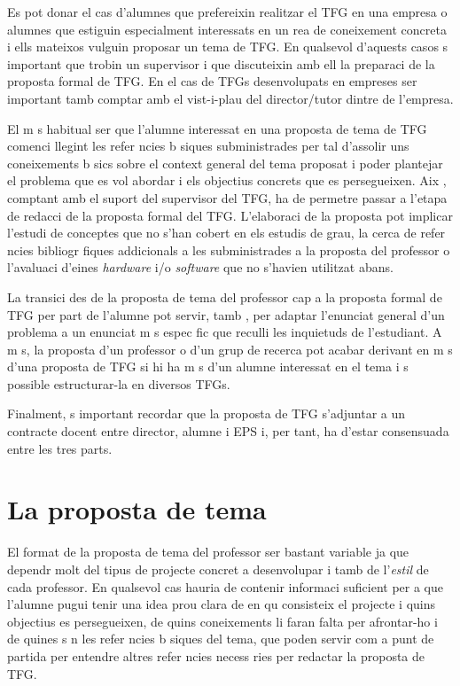 Es pot donar el cas d'alumnes que prefereixin realitzar el \ac{TFG} en una empresa o alumnes que estiguin especialment interessats en un  rea de coneixement concreta i ells mateixos vulguin proposar un tema de \ac{TFG}. En qualsevol d'aquests casos  s important que trobin un supervisor i que discuteixin amb ell la preparaci  de la proposta formal de \ac{TFG}. En el cas de \ac{TFG}s desenvolupats en empreses ser  important tamb  comptar amb el vist-i-plau del director/tutor dintre de l'empresa.

El m s habitual ser  que l'alumne interessat en una proposta de tema de \ac{TFG} comenci llegint les refer ncies b siques subministrades per tal d'assolir uns coneixements b sics sobre el context general del tema proposat i poder plantejar el problema que es vol abordar i els objectius concrets que es persegueixen. Aix , comptant amb el suport del supervisor del \ac{TFG}, ha de permetre passar a l'etapa de redacci  de la proposta formal del \ac{TFG}. L'elaboraci  de la proposta pot implicar l'estudi de conceptes que no s'han cobert en els estudis de grau, la cerca de refer ncies bibliogr fiques addicionals a les subministrades a la proposta del professor o l'avaluaci  d'eines \emph{hardware} i/o \emph{software} que no s'havien utilitzat abans.

La transici  des de la proposta de tema del professor cap a la proposta formal de \ac{TFG} per part de l'alumne pot servir, tamb , per adaptar l'enunciat general d'un problema a un enunciat m s espec fic que reculli les inquietuds de l'estudiant. A m s, la proposta d'un professor o d'un grup de recerca pot acabar derivant en m s d'una proposta de \ac{TFG} si hi ha m s d'un alumne interessat en el tema i  s possible estructurar-la en diversos \ac{TFG}s.

Finalment,  s important recordar que la proposta de \ac{TFG} s'adjuntar  a un contracte docent entre director, alumne i \ac{EPS} i, per tant, ha d'estar consensuada entre les tres parts.


\section{La proposta de tema}

El format de la proposta de tema del professor ser  bastant variable ja que dependr  molt del tipus de projecte concret a desenvolupar i tamb  de l'\emph{estil} de cada professor. En qualsevol cas hauria de contenir informaci  suficient per a que l'alumne pugui tenir una idea prou clara de en qu  consisteix el projecte i quins objectius es persegueixen, de quins coneixements li faran falta per afrontar-ho i de quines s n les refer ncies b siques del tema, que poden servir com a punt de partida per entendre altres refer ncies necess ries per redactar la proposta de \ac{TFG}.

